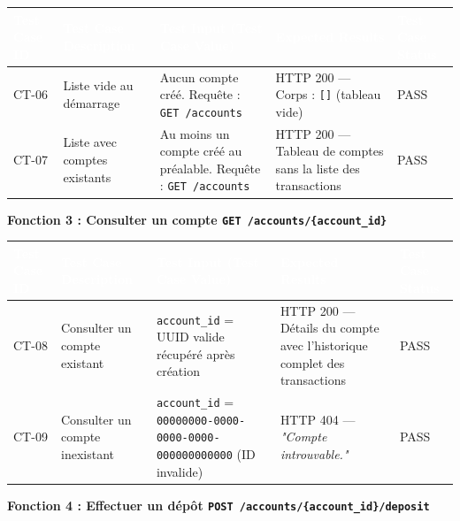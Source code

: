 \documentclass[12pt,a4paper,landscape]{article}
\begin{document}
\begin{longtable}{|L{2cm}|L{5cm}|L{6.5cm}|L{5cm}|L{2.5cm}|}
\hline
{}
\textbf{\textcolor{white}{Test Case ID}} &
\textbf{\textcolor{white}{Test Case Description}} &
\textbf{\textcolor{white}{Test Input (Test Case Value)}} &
\textbf{\textcolor{white}{Expected Results}} &
\textbf{\textcolor{white}{Test Case Status}} \\
\hline
CT-06 &
Liste vide au démarrage &
Aucun compte créé. \newline Requête : \texttt{GET /accounts} &
HTTP 200 — Corps : \texttt{[]} (tableau vide) &
PASS \\
\hline
{}
CT-07 &
Liste avec comptes existants &
Au moins un compte créé au préalable. \newline Requête : \texttt{GET /accounts} &
HTTP 200 — Tableau de comptes sans la liste des transactions &
PASS \\
\hline
\end{longtable}

\vspace{0.3cm}
{\bfseries\large\textcolor{rowtitle}{Fonction 3 : Consulter un compte \quad \texttt{GET /accounts/\{account\_id\}}}}
\vspace{0.2cm}

\begin{longtable}{|L{2cm}|L{5cm}|L{6.5cm}|L{5cm}|L{2.5cm}|}
\hline
{}
\textbf{\textcolor{white}{Test Case ID}} &
\textbf{\textcolor{white}{Test Case Description}} &
\textbf{\textcolor{white}{Test Input (Test Case Value)}} &
\textbf{\textcolor{white}{Expected Results}} &
\textbf{\textcolor{white}{Test Case Status}} \\
\hline
CT-08 &
Consulter un compte existant &
\texttt{account\_id} = UUID valide récupéré après création &
HTTP 200 — Détails du compte avec l'historique complet des transactions &
PASS \\
\hline
{}
CT-09 &
Consulter un compte inexistant &
\texttt{account\_id} = \texttt{00000000-0000-0000-0000-000000000000} (ID invalide) &
HTTP 404 — \textit{"Compte introuvable."} &
PASS \\
\hline
\end{longtable}

\vspace{0.3cm}
{\bfseries\large\textcolor{rowtitle}{Fonction 4 : Effectuer un dépôt \quad \texttt{POST /accounts/\{account\_id\}/deposit}}}
\vspace{0.2cm}
\end{document}
